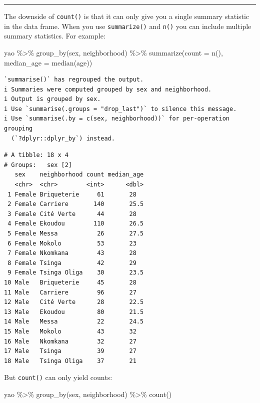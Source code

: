 \documentclass[
  letterpaper,
  DIV=11,
  numbers=noendperiod]{scrreprt}
\newenvironment{Shaded}{\begin{snugshade}}{\end{snugshade}}
\newcommand{\AttributeTok}[1]{\textcolor[rgb]{0.40,0.45,0.13}{#1}}
\newcommand{\FunctionTok}[1]{\textcolor[rgb]{0.28,0.35,0.67}{#1}}
\newcommand{\NormalTok}[1]{\textcolor[rgb]{0.00,0.23,0.31}{#1}}
\newcommand{\SpecialCharTok}[1]{\textcolor[rgb]{0.37,0.37,0.37}{#1}}
\begin{document}
\begin{center}\rule{0.5\linewidth}{0.5pt}\end{center}

The downside of \texttt{count()} is that it can only give you a single
summary statistic in the data frame. When you use \texttt{summarize()}
and \texttt{n()} you can include multiple summary statistics. For
example:

\begin{Shaded}
\begin{Highlighting}[]
\NormalTok{yao }\SpecialCharTok{\%\textgreater{}\%} 
  \FunctionTok{group\_by}\NormalTok{(sex, neighborhood) }\SpecialCharTok{\%\textgreater{}\%} 
  \FunctionTok{summarize}\NormalTok{(}\AttributeTok{count =} \FunctionTok{n}\NormalTok{(), }
            \AttributeTok{median\_age =} \FunctionTok{median}\NormalTok{(age))}
\end{Highlighting}
\end{Shaded}

\begin{verbatim}
`summarise()` has regrouped the output.
i Summaries were computed grouped by sex and neighborhood.
i Output is grouped by sex.
i Use `summarise(.groups = "drop_last")` to silence this message.
i Use `summarise(.by = c(sex, neighborhood))` for per-operation grouping
  (`?dplyr::dplyr_by`) instead.
\end{verbatim}

\begin{verbatim}
# A tibble: 18 x 4
# Groups:   sex [2]
   sex    neighborhood count median_age
   <chr>  <chr>        <int>      <dbl>
 1 Female Briqueterie     61       28  
 2 Female Carriere       140       25.5
 3 Female Cité Verte      44       28  
 4 Female Ekoudou        110       26.5
 5 Female Messa           26       27.5
 6 Female Mokolo          53       23  
 7 Female Nkomkana        43       28  
 8 Female Tsinga          42       29  
 9 Female Tsinga Oliga    30       23.5
10 Male   Briqueterie     45       28  
11 Male   Carriere        96       27  
12 Male   Cité Verte      28       22.5
13 Male   Ekoudou         80       21.5
14 Male   Messa           22       24.5
15 Male   Mokolo          43       32  
16 Male   Nkomkana        32       27  
17 Male   Tsinga          39       27  
18 Male   Tsinga Oliga    37       21  
\end{verbatim}

But \texttt{count()} can only yield counts:

\begin{Shaded}
\begin{Highlighting}[]
\NormalTok{yao }\SpecialCharTok{\%\textgreater{}\%} 
  \FunctionTok{group\_by}\NormalTok{(sex, neighborhood) }\SpecialCharTok{\%\textgreater{}\%} 
  \FunctionTok{count}\NormalTok{()}
\end{Highlighting}
\end{Shaded}
\end{document}
